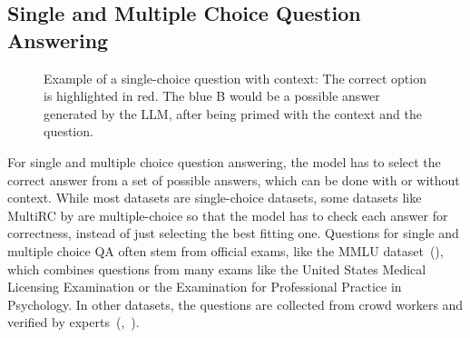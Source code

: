 \subsection{Single and Multiple Choice Question Answering}\label{sec:multiple-choice-qa}
\begin{figure}[tb]
    \centering
    \caption{Example of a single-choice question with context: The correct option is highlighted in red.
    The blue B would be a possible answer generated by the LLM, after being primed with the context and the question.
    }\label{fig:mc_example}
\end{figure}
For single and multiple choice question answering, the model has to select the correct answer from a set of possible answers, which can be done with or without context.
While most datasets are single-choice datasets, some datasets like MultiRC by \cite{khashabi:2018:Looking} are multiple-choice so that the model has to check each answer for correctness, instead of just selecting the best fitting one.
Questions for single and multiple choice QA often stem from official exams, like the MMLU dataset~(\cite{hendrycks:2020:Measuring}), which combines questions from many exams like the United States Medical Licensing Examination or the Examination for Professional Practice in Psychology.
In other datasets, the questions are collected from crowd workers and verified by experts~(\cite{clark:2018:Think},~\cite{mihaylov:2018:Can}).

